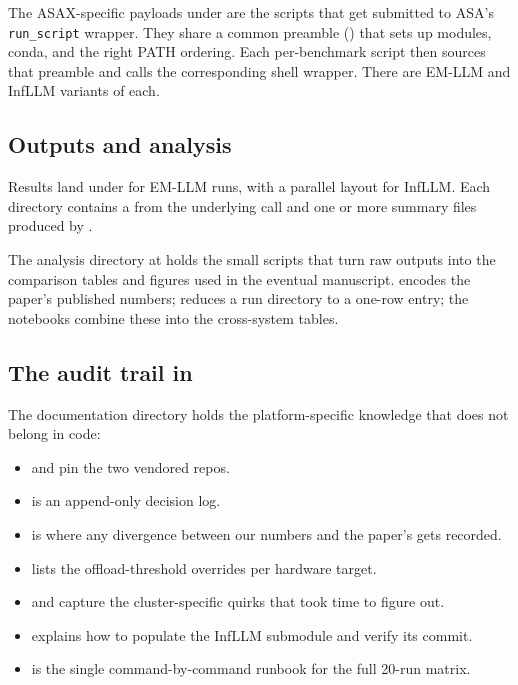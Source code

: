 The ASAX-specific payloads under  are the scripts that get submitted to ASA's \texttt{run\_script} wrapper. They share a common preamble () that sets up modules, conda, and the right PATH ordering. Each per-benchmark script then sources that preamble and calls the corresponding shell wrapper. There are EM-LLM and InfLLM variants of each.

\subsection{Outputs and analysis}
\label{sec:outputs}

Results land under  for EM-LLM runs, with a parallel  layout for InfLLM. Each directory contains a  from the underlying  call and one or more summary files produced by .

The analysis directory at  holds the small scripts that turn raw outputs into the comparison tables and figures used in the eventual manuscript.  encodes the paper's published numbers;  reduces a run directory to a one-row entry; the notebooks combine these into the cross-system tables.

\subsection{The audit trail in }
\label{sec:audit-trail}

The documentation directory holds the platform-specific knowledge that does not belong in code:
\begin{itemize}
  \item {} and  pin the two vendored repos.
  \item {} is an append-only decision log.
  \item {} is where any divergence between our numbers and the paper's gets recorded.
  \item {} lists the offload-threshold overrides per hardware target.
  \item {} and  capture the cluster-specific quirks that took time to figure out.
  \item {} explains how to populate the InfLLM submodule and verify its commit.
  \item {} is the single command-by-command runbook for the full 20-run matrix.
\end{itemize}


